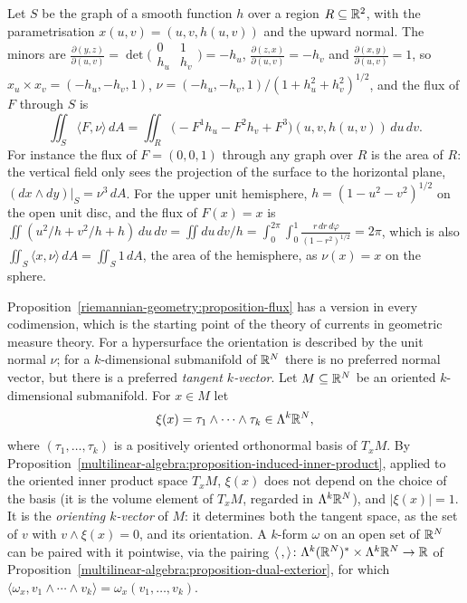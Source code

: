\begin{example}\label{riemannian-geometry:example-flux-graph}
Let $S$ be the graph of a smooth function $h$ over a region $R \subseteq \mathbb{R}^2$, with the parametrisation $x(u, v) = (u, v, h(u, v))$ and the upward normal. The minors are
$\frac{\partial(y, z)}{\partial(u, v)} = \det\bigl(\begin{smallmatrix} 0 & 1\\ h_u & h_v\end{smallmatrix}\bigr) = -h_u$, $\frac{\partial(z, x)}{\partial(u, v)} = -h_v$ and $\frac{\partial(x, y)}{\partial(u, v)} = 1$, so
$x_u \times x_v = (-h_u, -h_v, 1)$, $\nu = (-h_u, -h_v, 1)/(1 + h_u^2 + h_v^2)^{1/2}$, and the flux of $F$ through $S$ is
\[
\iint_S\langle F, \nu\rangle\,dA = \iint_R\bigl(-F^1h_u - F^2h_v + F^3\bigr)(u, v, h(u, v))\,du\,dv .
\]
For instance the flux of $F = (0, 0, 1)$ through any graph over $R$ is the area of $R$: the vertical field only sees the projection of the surface to the horizontal plane, $(dx \wedge dy)|_S = \nu^3\,dA$.
For the upper unit hemisphere, $h = (1 - u^2 - v^2)^{1/2}$ on the open unit disc, and the flux of $F(x) = x$ is
$\iint(u^2/h + v^2/h + h)\,du\,dv = \iint du\,dv/h = \int_0^{2\pi}\!\!\int_0^1\frac{r\,dr\,d\varphi}{(1 - r^2)^{1/2}} = 2\pi$, which is also $\iint_S\langle x, \nu\rangle\,dA = \iint_S1\,dA$, the area of the hemisphere,
as $\nu(x) = x$ on the sphere.
\end{example}

Proposition~\ref{riemannian-geometry:proposition-flux} has a version in every codimension, which is the starting point of the theory of currents in geometric measure theory. For a hypersurface the
orientation is described by the unit normal $\nu$; for a $k$-dimensional submanifold of $\mathbb{R}^N$ there is no preferred normal vector, but there is a preferred \emph{tangent $k$-vector}. Let
$M \subseteq \mathbb{R}^N$ be an oriented $k$-dimensional submanifold. For $x \in M$ let
\[
\xi(x) = \tau_1 \wedge \cdots \wedge \tau_k \in \Lambda^k\mathbb{R}^N,
\]
where $(\tau_1, \ldots, \tau_k)$ is a positively oriented orthonormal basis of $T_xM$. By Proposition~\ref{multilinear-algebra:proposition-induced-inner-product}, applied to the oriented inner
product space $T_xM$, $\xi(x)$ does not depend on the choice of the basis (it is the volume element of $T_xM$, regarded in $\Lambda^k\mathbb{R}^N$), and $|\xi(x)| = 1$. It is the \emph{orienting $k$-vector}
of $M$: it determines both the tangent space, as the set of $v$ with $v \wedge \xi(x) = 0$, and its orientation. A $k$-form $\omega$ on an open set of $\mathbb{R}^N$ can be paired with it pointwise, via the
pairing $\langle\,,\rangle \colon \Lambda^k(\mathbb{R}^N)^* \times \Lambda^k\mathbb{R}^N \to \mathbb{R}$ of Proposition~\ref{multilinear-algebra:proposition-dual-exterior}, for which
$\langle\omega_x, v_1 \wedge \cdots \wedge v_k\rangle = \omega_x(v_1, \ldots, v_k)$.

